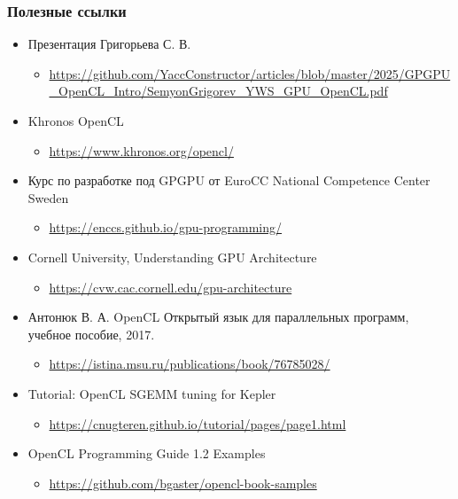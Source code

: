 \documentclass[
    aspectratio=169,
]{beamer}
\begin{document}
\begin{frame}
    \frametitle{Полезные ссылки}

    \begin{itemize}
        \item Презентация Григорьева С. В.
              \begin{itemize}
                  \item \scriptsize{\url{https://github.com/YaccConstructor/articles/blob/master/2025/GPGPU_OpenCL_Intro/SemyonGrigorev_YWS_GPU_OpenCL.pdf}}
              \end{itemize}
        \item {Khronos OpenCL}
              \begin{itemize}
                  \item \scriptsize{\url{https://www.khronos.org/opencl/}}
              \end{itemize}
        \item {Курс по разработке под GPGPU от EuroCC National Competence Center Sweden}
              \begin{itemize}
                  \item \scriptsize{\url{https://enccs.github.io/gpu-programming/}}
              \end{itemize}
        \item {Cornell University, Understanding GPU Architecture}
              \begin{itemize}
                  \item \scriptsize{\url{https://cvw.cac.cornell.edu/gpu-architecture}}
              \end{itemize}
        \item {Антонюк В. А. OpenCL Открытый язык для параллельных программ, учебное пособие, 2017.}
              \begin{itemize}
                  \item \scriptsize{\url{https://istina.msu.ru/publications/book/76785028/}}
              \end{itemize}
        \item Tutorial: OpenCL SGEMM tuning for Kepler
              \begin{itemize}
                  \item \scriptsize{\url{https://cnugteren.github.io/tutorial/pages/page1.html}}
              \end{itemize}
        \item OpenCL Programming Guide 1.2 Examples
              \begin{itemize}
                  \item \scriptsize{\url{https://github.com/bgaster/opencl-book-samples}}
              \end{itemize}
    \end{itemize}

\end{frame}
\end{document}
